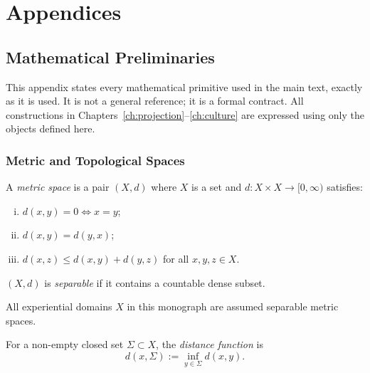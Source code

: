 \documentclass[11pt,openany]{book}
\begin{document}
\appendix
\part*{Appendices}


\chapter{Mathematical Preliminaries}
\label{app:mathematics}

This appendix states every mathematical primitive used in
the main text, exactly as it is used.  It is not a general
reference; it is a formal contract.  All constructions in
Chapters~\ref{ch:projection}--\ref{ch:culture} are expressed
using only the objects defined here.

\section{Metric and Topological Spaces}
\label{sec:metric-spaces}

\begin{definition}
A \emph{metric space} is a pair $(X, d)$ where $X$ is a
set and $d : X \times X \to [0, \infty)$ satisfies:
\begin{enumerate}[(i)]
  \item $d(x,y) = 0 \iff x = y$;
  \item $d(x,y) = d(y,x)$;
  \item $d(x,z) \le d(x,y) + d(y,z)$ for all $x,y,z \in X$.
\end{enumerate}
\end{definition}

\begin{definition}
$(X,d)$ is \emph{separable} if it contains a countable
dense subset.
\end{definition}

All experiential domains $X$ in this monograph are assumed
separable metric spaces.

\begin{definition}
For a non-empty closed set $\Sigma \subset X$, the
\emph{distance function} is
\[
  d(x, \Sigma) := \inf_{y \in \Sigma} d(x,y).
\]
\end{definition}
\end{document}
